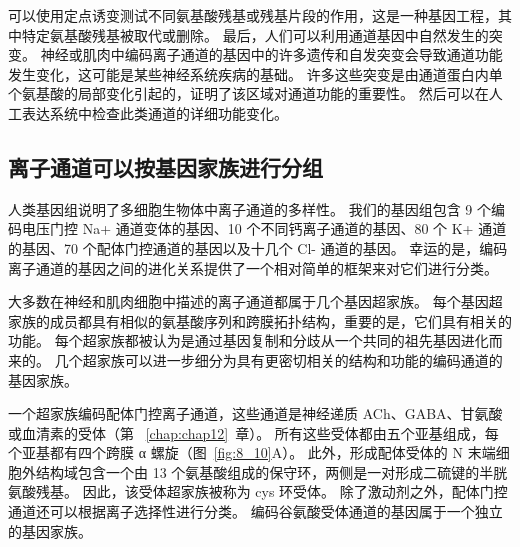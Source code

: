 可以使用定点诱变测试不同氨基酸残基或残基片段的作用，这是一种基因工程，其中特定氨基酸残基被取代或删除。
最后，人们可以利用通道基因中自然发生的突变。
神经或肌肉中编码离子通道的基因中的许多遗传和自发突变会导致通道功能发生变化，这可能是某些神经系统疾病的基础。
许多这些突变是由通道蛋白内单个氨基酸的局部变化引起的，证明了该区域对通道功能的重要性。
然后可以在人工表达系统中检查此类通道的详细功能变化。



\subsection{离子通道可以按基因家族进行分组}

人类基因组说明了多细胞生物体中离子通道的多样性。 我们的基因组包含 9 个编码电压门控 Na+ 通道变体的基因、10 个不同钙离子通道的基因、80 个 K+ 通道的基因、70 个配体门控通道的基因以及十几个 Cl- 通道的基因。
幸运的是，编码离子通道的基因之间的进化关系提供了一个相对简单的框架来对它们进行分类。


大多数在神经和肌肉细胞中描述的离子通道都属于几个基因超家族。
每个基因超家族的成员都具有相似的氨基酸序列和跨膜拓扑结构，重要的是，它们具有相关的功能。
每个超家族都被认为是通过基因复制和分歧从一个共同的祖先基因进化而来的。
几个超家族可以进一步细分为具有更密切相关的结构和功能的编码通道的基因家族。


一个超家族编码配体门控离子通道，这些通道是神经递质 ACh、GABA、甘氨酸或血清素的受体（第 ~\ref{chap:chap12}~章）。 
所有这些受体都由五个亚基组成，每个亚基都有四个跨膜 α 螺旋（图~\ref{fig:8_10}A）。 
此外，形成配体受体的 N 末端细胞外结构域包含一个由 13 个氨基酸组成的保守环，两侧是一对形成二硫键的半胱氨酸残基。
因此，该受体超家族被称为 cys 环受体。
除了激动剂之外，配体门控通道还可以根据离子选择性进行分类。
编码谷氨酸受体通道的基因属于一个独立的基因家族。


